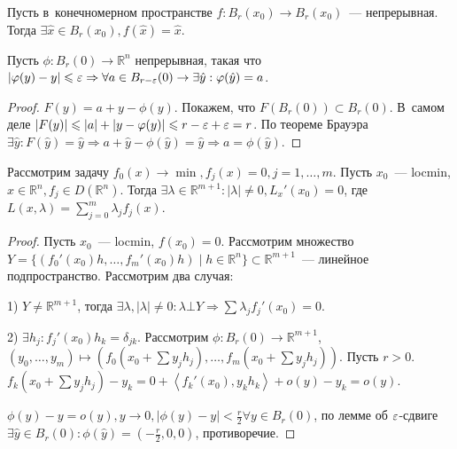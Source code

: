 \documentclass{article}
\begin{document}
\begin{theorem}
	Пусть в~конечномерном пространстве $f: B_r(x_0) \rightarrow B_r(x_0)$~---
	непрерывная. Тогда $\exists \hat{x} \in B_r(x_0), f(\hat{x}) = \hat{x}$.
\end{theorem}
\begin{corollary}
	Пусть $\phi: B_r(0) \rightarrow \mathbb{R}^n$ непрерывная, такая что $|\varphi(y)
	- y| \leqslant \varepsilon \Rightarrow \forall a \in B_{r-\varepsilon}(0) \rightarrow \exists
	\hat{y}: \varphi(\hat{y}) = a$.
\end{corollary}
\begin{proof}
	$F(y) = a + y - \phi(y)$. Покажем, что $F(B_r(0)) \subset B_r(0)$. В~самом
	деле $|F(y)| \leqslant |a| + |y - \varphi(y)| \leqslant r - \varepsilon + \varepsilon = r$. По теореме
	Брауэра $\exists \hat{y}: F(\hat{y}) = \hat{y} \Rightarrow a + \hat{y} -
	\phi(\hat{y}) = \hat{y} \Rightarrow a = \phi(\hat{y})$.
\end{proof}

\begin{theorem}
	Рассмотрим задачу $f_0(x) \rightarrow \min, f_j(x) = 0, j = 1, \ldots, m$.
	Пусть $x_0$~--- locmin, $x \in \mathbb{R}^n, f_j \in D(\mathbb{R}^n)$. Тогда
	$\exists \lambda \in \mathbb{R}^{m+1}: |\lambda| \ne 0, L_x'(x_0) = 0$, где
	$L(x, \lambda) = \sum\limits_{j=0}^m \lambda_j f_j(x)$.
\end{theorem}
\begin{proof}
	Пусть $x_0$~--- locmin, $f(x_0) = 0$. Рассмотрим множество $Y = \{(f_0'(x_0)h,
	\ldots, f_m'(x_0)h) \mid h \in \mathbb{R}^n\} \subset \mathbb{R}^{m+1}$~---
	линейное подпространство.	Рассмотрим два случая:

	1) $Y \ne \mathbb{R}^{m+1}$, тогда $\exists \lambda, |\lambda| \ne 0: \lambda
	\bot Y \Rightarrow \sum \lambda_j f_j'(x_0) = 0$.

	2) $\exists h_j: f_j'(x_0) h_k = \delta_{jk}$. Рассмотрим $\phi: B_r(0)
	\rightarrow \mathbb{R}^{m+1}$, $(y_0, \ldots, y_m) \mapsto (f_0(x_0 + \sum y_j
	h_j), \ldots, f_m(x_0 + \sum y_j h_j))$. Пусть $r > 0$. $f_k(x_0 + \sum y_j
	h_j) - y_k = 0 + \left<f_k'(x_0), y_k h_k \right> + o(y) - y_k = o(y)$.

	$\phi(y) - y = o(y), y \rightarrow 0, |\phi(y) - y| < \frac{r}{2} \forall y
	\in B_r(0)$, по лемме об $\varepsilon$-сдвиге $\exists \hat{y} \in B_r(0):
	\phi(\hat{y}) = \left( -\frac{r}{2}, 0, 0\right)$, противоречие.
\end{proof}
\end{document}
